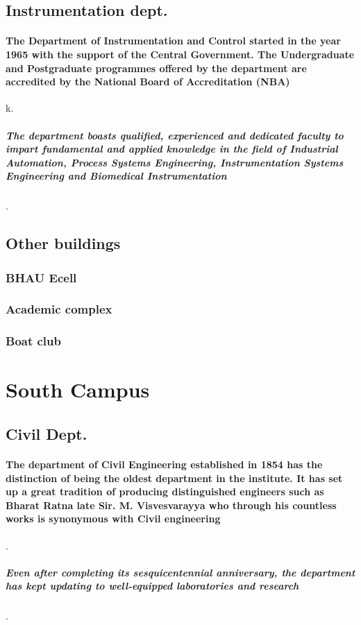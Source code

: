 \documentclass{article}
\begin{document}
	\subsection{Instrumentation dept.}
\paragraph{ The Department of Instrumentation and Control started in the year 1965 with the support of the Central Government. The Undergraduate and Postgraduate programmes offered by the department are accredited by the National Board of Accreditation (NBA)}k.
\subparagraph{ The department boasts qualified, experienced and dedicated faculty to impart fundamental and applied knowledge in the field of Industrial Automation, Process Systems Engineering, Instrumentation Systems Engineering and Biomedical Instrumentation}.
\newpage
	\subsection{Other buildings}
	\subsubsection{BHAU Ecell}
	\subsubsection{Academic complex}
	\subsubsection{Boat club}
\newpage
\section{South Campus}

	\subsection{Civil Dept.}
	 \paragraph{ The department of Civil Engineering established in 1854 has the distinction of being the oldest department in the institute. It has set up a great tradition of producing distinguished engineers such as Bharat Ratna late Sir. M. Visvesvarayya who through his countless works is synonymous with Civil engineering}. \subparagraph{ Even after completing its sesquicentennial anniversary, the department has kept updating to well-equipped laboratories and research}.
	 \newpage
\end{document}
